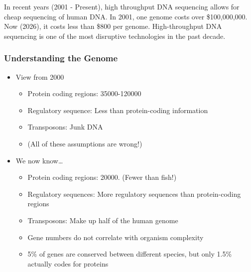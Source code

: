 \documentclass[10pt]{article}
\begin{document}
In recent years (2001 - Present), high throughput DNA sequencing allows for cheap sequencing of human DNA.  In 2001, one genome costs over \$100,000,000.  Now (2026), it costs less than \$800 per genome.  High-throughput DNA sequencing is one of the most disruptive technologies in the past decade.

\subsubsection*{Understanding the Genome}
\begin{itemize}
    \item View from 2000
    \begin{itemize}
        \item Protein coding regions: 35000-120000
        \item Regulatory sequence: Less than protein-coding information
        \item Transposons: Junk DNA
        \item (All of these assumptions are wrong!)
    \end{itemize}
    \item We now know\dots
    \begin{itemize}
        \item Protein coding regions: 20000.  (Fewer than fish!)
        \item Regulatory sequences: More regulatory sequences than protein-coding regions
        \item Transposons: Make up half of the human genome
        \item Gene numbers do not correlate with organism complexity
        \item 5\% of genes are conserved between different species, but only 1.5\% actually codes for proteins
    \end{itemize}
\end{itemize}
\end{document}
